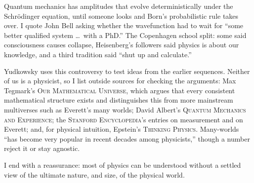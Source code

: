 Quantum mechanics has amplitudes that evolve deterministically under the Schrödinger equation, until someone looks and Born's probabilistic rule takes over. I quote John Bell asking whether the wavefunction had to wait for ``some better qualified system \ldots\ with a PhD.'' The Copenhagen school split: some said consciousness causes collapse, Heisenberg's followers said physics is about our knowledge, and a third tradition said ``shut up and calculate.'' 

Yudkowsky uses this controversy to test ideas from the earlier sequences. Neither of us is a physicist, so I list outside sources for checking the arguments: Max Tegmark's \textsc{Our Mathematical Universe}, which argues that every consistent mathematical structure exists and distinguishes this from more mainstream multiverses such as Everett's many worlds; David Albert's \textsc{Quantum Mechanics and Experience}; the \textsc{Stanford Encyclopedia}'s entries on measurement and on Everett; and, for physical intuition, Epstein's \textsc{Thinking Physics}. Many-worlds ``has become very popular in recent decades among physicists,'' though a number reject it or stay agnostic. 

I end with a reassurance: most of physics can be understood without a settled view of the ultimate nature, and size, of the physical world.
